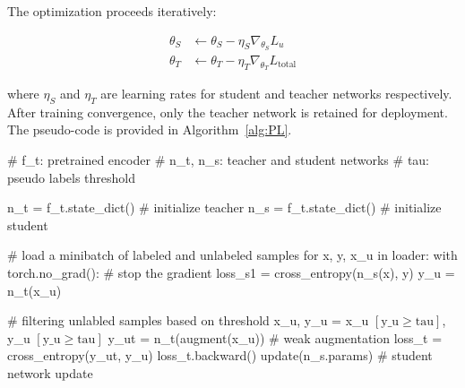 The optimization proceeds iteratively:

\begin{align}
\theta_S &\leftarrow \theta_S - \eta_S \nabla_{\theta_S} L_u \\
\theta_T &\leftarrow \theta_T - \eta_T \nabla_{\theta_T} L_{\text{total}}
\end{align}

where $\eta_S$ and $\eta_T$ are learning rates for student and teacher networks respectively. After training convergence, only the teacher network is retained for deployment. The pseudo-code is provided in Algorithm~\ref{alg:PL}.

\begin{algorithm}[!htbp]
\caption{Pseudo labeling with RLPL} \label{alg:PL}
\begin{algorithmic}

\State \textcolor{pythoncomment}{\# f\_t: pretrained encoder}
\State \textcolor{pythoncomment}{\# n\_t, n\_s: teacher and student networks}
\State \textcolor{pythoncomment}{\# tau: pseudo labels threshold}

\State \text{}


\State n\_t = f\_t.state\_dict() \textcolor{pythoncomment}{\# initialize teacher}
\State n\_s = f\_t.state\_dict() \textcolor{pythoncomment}{\# initialize student}

\State \text{}

\State \textcolor{pythoncomment}{\# load a minibatch of labeled and unlabeled samples}
\State  \textcolor{pythonfunction}{for} x, y, x\_u \textcolor{pythonfunction}{in} loader:
\State \hspace{1.1em}	\textcolor{purpleish}{with} torch.no\_grad(): \textcolor{pythoncomment}{\# stop the gradient}
\State \hspace{2.5em} loss\_s1 = cross\_entropy(n\_s(x), y)
\State \hspace{1.1em} y\_u = n\_t(x\_u) 

\State \text{}

\State \hspace{1.1em} \textcolor{pythoncomment}{\# filtering unlabled samples based on threshold}
\State \hspace{1.1em} x\_u, y\_u = x\_u $\left[  \text{y\_u} \geq \text{tau}\right]$, y\_u $\left[  \text{y\_u} \geq \text{tau}\right]$
\State \hspace{1.1em} y\_ut = n\_t(augment(x\_u))  \textcolor{pythoncomment}{\# weak augmentation}
\State \hspace{1.1em} loss\_t = cross\_entropy(y\_ut, y\_u)
\State \hspace{1.1em} loss\_t.backward()
\State \hspace{1.1em} update(n\_s.params) \textcolor{pythoncomment}{\# student network update}


\end{algorithmic}
\end{algorithm}
